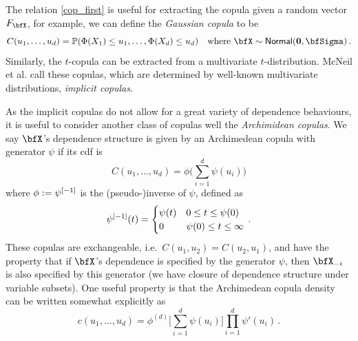The relation \eqref{cop_first} is useful for extracting the copula given a random vector $F_{\bfX}$, for example, we can define the \emph{Gaussian copula} to be
\[ C(u_1, \dots, u_d) = \Prob(\Phi(X_1) \le u_1, \dots, \Phi(X_d) \le u_d) \quad \text{where } \bfX \sim \NormDist(\bfzero, \bfSigma) \,. \]
Similarly, the $t$-copula can be extracted from a multivariate $t$-distribution. McNeil et al. \cite{mcneil2015quantitative} call these copulas, which are determined by well-known multivariate distributions, \emph{implicit copulas}.

As the implicit copulas do not allow for a great variety of dependence behaviours, it is useful to consider another class of copulas well the \emph{Archimidean copulas}. We say $\bfX$'s dependence structure is given by an Archimedean copula with generator $\psi$ if its cdf is
\begin{equation*}
C(u_1, \dots, u_d) = \phi\bigl( \sum_{i=1}^d \psi(u_i) \bigr)
\end{equation*}
where $\phi := \psi^{[-1]}$ is the (pseudo-)inverse of $\psi$, defined as
\[ \psi^{[-1]}(t) = \begin{cases}
\psi(t) & 0 \le t \le \psi(0) \\
0 & \psi(0) \le t \le \infty
\end{cases} \,. \]
These copulas are exchangeable, i.e.\ $C(u_1, u_2) = C(u_2, u_1)$, and have the property that if $\bfX$'s dependence is specified by the generator $\psi$,  then $\bfX_{-i}$ is also specified by this generator (we have closure of dependence structure under variable subsets). One useful property is that the Archimedean copula density can be written somewhat explicitly as
\[ c(u_1, \dots, u_d) = \phi^{(d)}\bigl[ \sum_{i=1}^d \psi(u_i) \bigr] \prod_{i=1}^d \psi'(u_i) \,. \]

